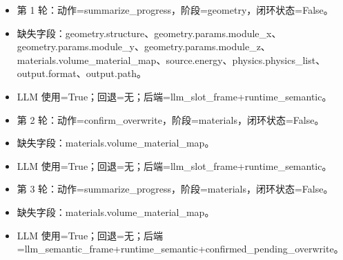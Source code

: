 \documentclass[11pt]{ctexart}
\begin{document}
\begin{itemize}
\item 第 1 轮：动作=summarize\_progress，阶段=geometry，闭环状态=False。
\item 缺失字段：geometry.structure、geometry.params.module\_x、geometry.params.module\_y、geometry.params.module\_z、materials.volume\_material\_map、source.energy、physics.physics\_list、output.format、output.path。
\item LLM 使用=True；回退=无；后端=llm\_slot\_frame+runtime\_semantic。
\item 第 2 轮：动作=confirm\_overwrite，阶段=materials，闭环状态=False。
\item 缺失字段：materials.volume\_material\_map。
\item LLM 使用=True；回退=无；后端=llm\_slot\_frame+runtime\_semantic。
\item 第 3 轮：动作=summarize\_progress，阶段=materials，闭环状态=False。
\item 缺失字段：materials.volume\_material\_map。
\item LLM 使用=True；回退=无；后端=llm\_semantic\_frame+runtime\_semantic+confirmed\_pending\_overwrite。
\end{itemize}
\end{document}
